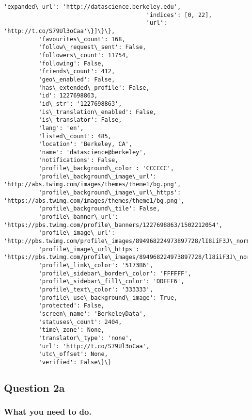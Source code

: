 \documentclass[11pt]{article}
\begin{document}
\begin{Verbatim}[commandchars=\\\{\}]
                                         'expanded\_url': 'http://datascience.berkeley.edu',
                                         'indices': [0, 22],
                                         'url': 'http://t.co/S79Ul3oCaa'\}]\}\},
          'favourites\_count': 168,
          'follow\_request\_sent': False,
          'followers\_count': 11754,
          'following': False,
          'friends\_count': 412,
          'geo\_enabled': False,
          'has\_extended\_profile': False,
          'id': 1227698863,
          'id\_str': '1227698863',
          'is\_translation\_enabled': False,
          'is\_translator': False,
          'lang': 'en',
          'listed\_count': 485,
          'location': 'Berkeley, CA',
          'name': 'datascience@berkeley',
          'notifications': False,
          'profile\_background\_color': 'CCCCCC',
          'profile\_background\_image\_url': 'http://abs.twimg.com/images/themes/theme1/bg.png',
          'profile\_background\_image\_url\_https': 'https://abs.twimg.com/images/themes/theme1/bg.png',
          'profile\_background\_tile': False,
          'profile\_banner\_url': 'https://pbs.twimg.com/profile\_banners/1227698863/1502212054',
          'profile\_image\_url': 'http://pbs.twimg.com/profile\_images/894968224973897728/lI8iiF3J\_normal.jpg',
          'profile\_image\_url\_https': 'https://pbs.twimg.com/profile\_images/894968224973897728/lI8iiF3J\_normal.jpg',
          'profile\_link\_color': '5173B6',
          'profile\_sidebar\_border\_color': 'FFFFFF',
          'profile\_sidebar\_fill\_color': 'DDEEF6',
          'profile\_text\_color': '333333',
          'profile\_use\_background\_image': True,
          'protected': False,
          'screen\_name': 'BerkeleyData',
          'statuses\_count': 2404,
          'time\_zone': None,
          'translator\_type': 'none',
          'url': 'http://t.co/S79Ul3oCaa',
          'utc\_offset': None,
          'verified': False\}\}

    \end{Verbatim}

    \subsection{Question 2a}\label{question-2a}

\subsubsection{What you need to do.}\label{what-you-need-to-do.}
\end{document}
